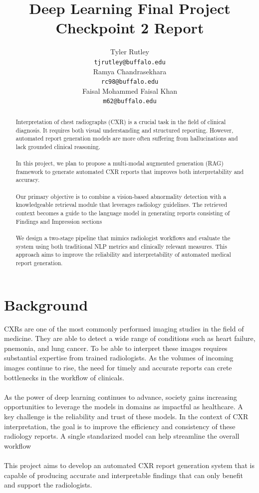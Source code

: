 \documentclass{article}
\title{Deep Learning Final Project Checkpoint 2 Report}
\author{%
  Tyler Rutley \\
  \texttt{tjrutley@buffalo.edu} \\
  \And
  Ramya Chandrasekhara \\
  \texttt{rc98@buffalo.edu} \\
  \And
  Faisal Mohammed Faisal Khan \\
  \texttt{m62@buffalo.edu} \\
}
\begin{document}
\maketitle
\begin{abstract}
 Interpretation of chest radiographs (CXR) is a crucial task in the field of clinical diagnosis. It requires both visual understanding and structured reporting. However, automated report generation models are more often suffering from hallucinations and lack grounded clinical reasoning. \\\\
 In this project, we plan to propose a multi-modal augmented generation (RAG) framework to generate automated CXR reports that improves both interpretability and accuracy.\\\\
 Our primary objective is to combine a vision-based abnormality detection with a knowledgeable retrieval module that leverages radiology guidelines. The retrieved context becomes a guide to the language model in generating reports consisting of Findings and Impression sections\\\\
  We design a two-stage pipeline that mimics radiologist workflows and  evaluate the system using both traditional NLP metrics and clinically relevant measures. This approach aims to improve the reliability and interpretability of automated medical report generation.
\end{abstract}



\section{Background}
CXRs are one of the most commonly performed imaging studies in the field of medicine. They are able to detect a wide range of conditions such as heart failure, pnemonia, and lung cancer. To be able to interpret these images requires substantial expertise from trained radiologists. As the volumes of incoming images continue to rise, the need for timely and accurate reports can crete bottlenecks in the workflow of clinicals.\\\\
As the power of deep learning continues to advance, society gains increasing opportunities to leverage the models in domains as impactful as healthcare. A key challenge is the reliability and trust of these models. In the context of CXR interpretation, the goal is to improve the efficiency and consistency of these radiology reports. A single standarized model can help streamline the overall workflow\\\\
This project aims to develop an automated CXR report generation system that is capable of producing accurate and interpretable findings that can only benefit and support the radiologists.
\end{document}
